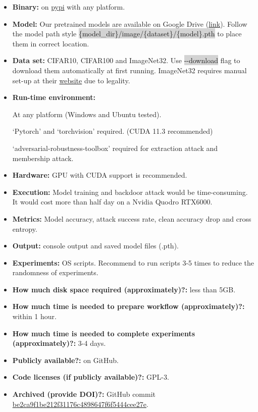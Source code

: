 \documentclass[letterpaper,twocolumn,10pt]{article}
\begin{document}
{\small
\begin{itemize}
    \item {\bf Binary: }on \href{https://pypi.org/project/autovul/}{pypi} with any platform.
    \item {\bf Model: }Our pretrained models are available on Google Drive (\href{https://drive.google.com/drive/folders/1GrjEO89hYrdLhDMkBLC26jp1C7BwIKwm?usp=sharing}{link}). Follow the model path style \colorbox{lightgray}{\{model\_dir\}/image/\{dataset\}/\{model\}.pth} to place them in correct location.
    \item {\bf Data set: }CIFAR10, CIFAR100 and ImageNet32. Use \colorbox{lightgray}{-{}-download} flag to download them automatically at first running. ImageNet32 requires manual set-up at their \href{https://image-net.org/download-images.php}{website} due to legality.
    \item {\bf Run-time environment: }

          At any platform (Windows and Ubuntu tested).

          `Pytorch' and `torchvision' required. (CUDA 11.3 recommended)

          `adversarial-robustness-toolbox' required for extraction attack and membership attack.
    \item {\bf Hardware: }GPU with CUDA support is recommended.
    \item {\bf Execution: }Model training and backdoor attack would be time-consuming. It would cost more than half day on a Nvidia Quodro RTX6000.
    \item {\bf Metrics: }Model accuracy, attack success rate, clean accuracy drop and cross entropy.
    \item {\bf Output: }console output and saved model files (.pth).
    \item {\bf Experiments: }OS scripts. Recommend to run scripts 3-5 times to reduce the randomness of experiments.
    \item {\bf How much disk space required (approximately)?: }less than 5GB.
    \item {\bf How much time is needed to prepare workflow (approximately)?: }within 1 hour.
    \item {\bf How much time is needed to complete experiments (approximately)?: }3-4 days.
    \item {\bf Publicly available?: }on GitHub.
    \item {\bf Code licenses (if publicly available)?: }GPL-3.
    \item {\bf Archived (provide DOI)?: }GitHub commit \href{https://github.com/ain-soph/autovul/tree/be2ca9f1be212f31176c4898647f6f5444cee27e}{be2ca9f1be212f31176c4898647f6f5444cee27e}.
\end{itemize}

}
\end{document}
